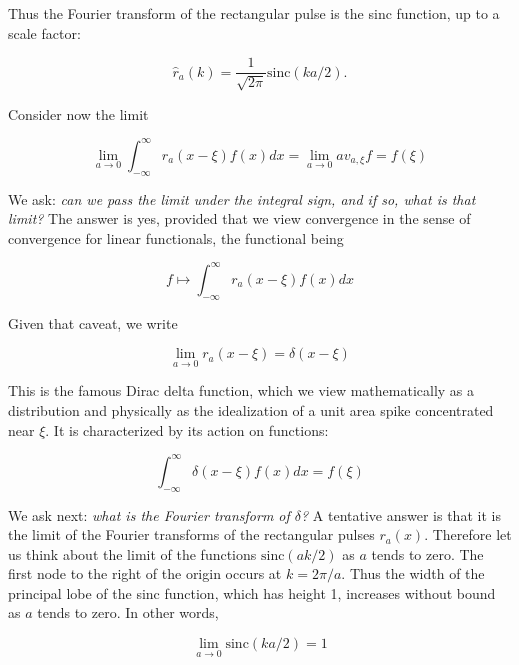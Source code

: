Thus the Fourier transform of the rectangular pulse is the sinc function, up to a scale factor:

\begin{equation}
\hat r_a(k) = \frac{1}{\sqrt{2\pi}}\text{sinc}(ka/2).
\end{equation}

Consider now the limit

\begin{equation}
\lim_{a \to 0}\int_{-\infty}^\infty r_a(x-\xi) f(x) dx = \lim_{a\to 0} av_{a,\xi} f = f(\xi)
\end{equation}

We ask: \emph{can we pass the limit under the integral sign, and if so, what is that limit?} The answer is yes, provided that we view convergence in the sense of convergence for linear functionals, the functional being

\begin{equation}
f \mapsto \int_{-\infty}^\infty r_a(x-\xi) f(x) dx
\end{equation}

Given that caveat, we write

\begin{equation}
\lim_{a \to 0} r_a(x-\xi)  = \delta(x - \xi)
\end{equation}

This is the famous Dirac delta function, which we view mathematically as a distribution and physically as the idealization of a unit area spike concentrated near $\xi$.
It is characterized by its action on functions:

\begin{equation}
\label{diracdelta1}
 \int_{-\infty}^\infty \delta(x-\xi)f(x)dx = f(\xi)
\end{equation}



We ask next: \emph{what is the Fourier transform of $\delta$?}
A tentative answer is that it is the limit of the Fourier transforms of the rectangular pulses $r_a(x)$.  Therefore let us think about the limit of the functions $\text{sinc}(ak/2)$ as $a$ tends to zero.  The first node to the right of the origin occurs at $k = 2\pi/a$.  Thus the width of the principal lobe of the sinc function, which has height 1, increases without bound as $a$ tends to zero.  In other words,

\begin{equation}
\lim_{a\to 0} \text{sinc}(ka/2)  = 1
\end{equation}

